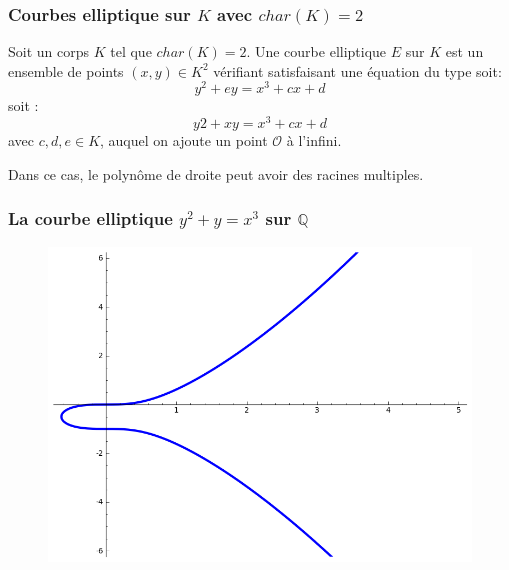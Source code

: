 \documentclass[9pt]{beamer}
\begin{document}
\begin{frame}
    \frametitle{Courbes elliptique sur $K$ avec $char(K) = 2$}
    \begin{df}
        Soit un corps $K$ tel que $char(K) = 2$. Une courbe elliptique $E$ sur $K$ est un
        ensemble de points $(x,y) \in K^2$ vérifiant satisfaisant une équation du type soit:
        \[
            y^2 + ey = x^3 + cx + d
        \]
        soit : 
        \[
            y2 + xy = x^3 + cx + d
        \]
        avec $c, d, e \in K$, auquel on ajoute un point $\mathcal{O}$ à l'infini.
    \end{df}

    \begin{rmq}
        Dans ce cas, le polynôme de droite peut avoir des racines multiples.
    \end{rmq}
\end{frame}

\begin{frame}
    \frametitle{La courbe elliptique $y^2 + y= x^3$ sur $\mathbb{Q}$}
    \begin{figure}
        \includegraphics[scale=0.5]{ecc2.png}
    \end{figure}
\end{frame}
\end{document}

